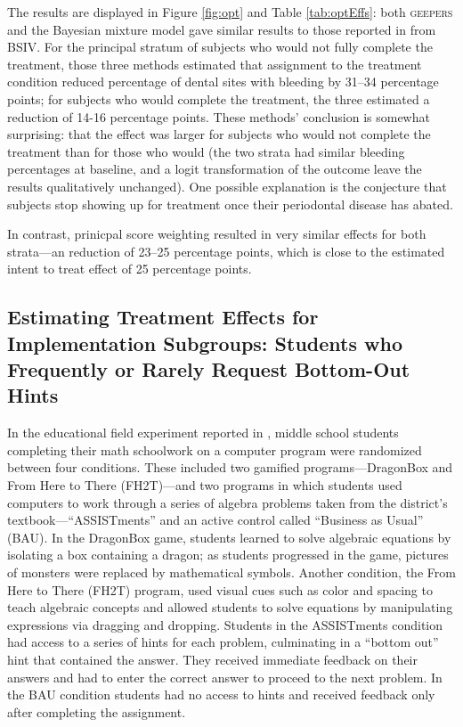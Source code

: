 \documentclass[]{article}
\begin{document}
The results are displayed in Figure \ref{fig:opt} and Table \ref{tab:optEffs}: both \textsc{geepers} and the Bayesian mixture model gave similar results to those reported in \citet{richardson2023estimating} from BSIV.
For the principal stratum of subjects who would not fully complete the treatment, those three methods estimated that assignment to the treatment condition reduced percentage of dental sites with bleeding by 31--34 percentage points; for subjects who would complete the treatment, the three estimated a reduction of 14-16 percentage points.
These methods' conclusion is somewhat surprising: that the effect was larger for subjects who would not complete the treatment than for those who would (the two strata had similar bleeding percentages at baseline, and a logit transformation of the outcome leave the results qualitatively unchanged). 
One possible explanation is the conjecture that subjects stop showing up for treatment once their periodontal disease has abated.

In contrast, prinicpal score weighting resulted in very similar effects for both strata---an reduction of 23--25 percentage points, which is close to the estimated intent to treat effect of 25 percentage points.

\subsection{Estimating Treatment Effects for Implementation Subgroups: Students who Frequently or Rarely Request Bottom-Out Hints}\label{sec:fh2t}

In the educational field experiment reported in \citet{impactPaper}, middle school students completing their math schoolwork on a computer program were randomized between four conditions.
These included two gamified programs---DragonBox and From Here to There (FH2T)---and two programs in which students used computers to work through a series of algebra problems taken from the district's textbook---``ASSISTments'' and an active control called ``Business as Usual'' (BAU).  %
In the DragonBox game, students learned to solve algebraic equations by isolating a box containing a dragon; as students progressed in the game, pictures of monsters were replaced by mathematical symbols.
Another condition, the From Here to There (FH2T) program, used visual cues such as color and spacing to teach algebraic concepts and allowed students to solve equations by manipulating expressions via dragging and dropping.
Students in the ASSISTments condition had access to a series of hints for each problem, culminating in a ``bottom out'' hint that contained the answer. They received immediate feedback on their answers and had to enter the correct answer to proceed to the next problem.
In the BAU condition students had no access to hints and received feedback only after completing the assignment.
\end{document}
